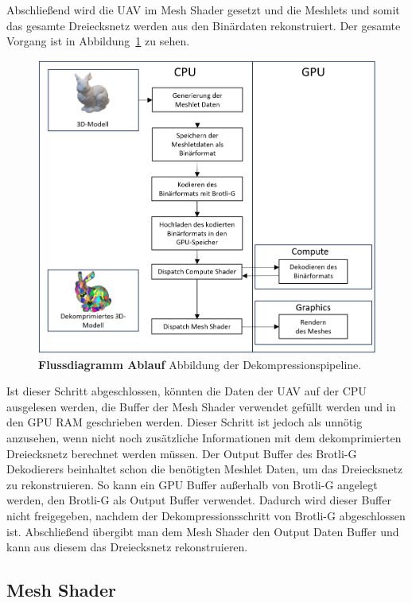 Abschließend wird die UAV im Mesh Shader gesetzt und die Meshlets und somit das gesamte Dreiecksnetz werden aus den Binärdaten rekonstruiert. \newline
Der gesamte Vorgang ist in Abbildung~\ref{fig:projekt} zu sehen.

\begin{figure}[htb]
  \centering  
  \includegraphics[scale=0.6]{Bilder/Ablauf_Projekt.png}
  \caption[Flussdiagramm Ablauf]{\textbf{Flussdiagramm Ablauf} Abbildung der Dekompressionspipeline.}
  \label{fig:projekt}
\end{figure}

Ist dieser Schritt abgeschlossen, könnten die Daten der UAV auf der CPU ausgelesen werden, die Buffer der Mesh Shader verwendet gefüllt werden und in den GPU RAM geschrieben werden.
Dieser Schritt ist jedoch als unnötig anzusehen, wenn nicht noch zusätzliche Informationen mit dem dekomprimierten Dreiecksnetz berechnet werden müssen.
Der Output Buffer des Brotli-G Dekodierers beinhaltet schon die benötigten Meshlet Daten, um das Dreiecksnetz zu rekonstruieren.
So kann ein GPU Buffer außerhalb von Brotli-G angelegt werden, den Brotli-G als Output Buffer verwendet.
Dadurch wird dieser Buffer nicht freigegeben, nachdem der Dekompressionsschritt von Brotli-G abgeschlossen ist.
Abschließend übergibt man dem Mesh Shader den Output Daten Buffer und kann aus diesem das Dreiecksnetz rekonstruieren.

\subsection{Mesh Shader}
\label{susbsec:mesh_shader}
